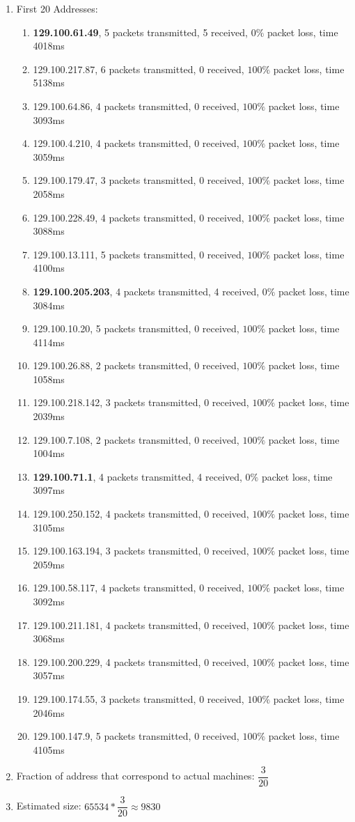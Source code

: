 \documentclass[12pt,letterpaper]{article}
\begin{document}
\begin{enumerate}
	\item First 20 Addresses:
	\begin{enumerate}
		\item \textbf{129.100.61.49}, 5 packets transmitted, 5 received, $0\%$ packet loss, time 4018ms
		\item 129.100.217.87, 6 packets transmitted, 0 received, $100\%$ packet loss, time 5138ms
		\item 129.100.64.86, 4 packets transmitted, 0 received, $100\%$ packet loss, time 3093ms
		\item 129.100.4.210, 4 packets transmitted, 0 received, $100\%$ packet loss, time 3059ms
		\item 129.100.179.47, 3 packets transmitted, 0 received, $100\%$ packet loss, time 2058ms
		\item 129.100.228.49, 4 packets transmitted, 0 received, $100\%$ packet loss, time 3088ms
		\item 129.100.13.111, 5 packets transmitted, 0 received, $100\%$ packet loss, time 4100ms
		\item \textbf{129.100.205.203}, 4 packets transmitted, 4 received, $0\%$ packet loss, time 3084ms
		\item 129.100.10.20, 5 packets transmitted, 0 received, $100\%$ packet loss, time 4114ms
		\item 129.100.26.88, 2 packets transmitted, 0 received, $100\%$ packet loss, time 1058ms
		\item 129.100.218.142, 3 packets transmitted, 0 received, $100\%$ packet loss, time 2039ms
		\item 129.100.7.108, 2 packets transmitted, 0 received, $100\%$ packet loss, time 1004ms
		\item \textbf{129.100.71.1}, 4 packets transmitted, 4 received, $0\%$ packet loss, time 3097ms
		\item 129.100.250.152, 4 packets transmitted, 0 received, $100\%$ packet loss, time 3105ms
		\item 129.100.163.194, 3 packets transmitted, 0 received, $100\%$ packet loss, time 2059ms
		\item 129.100.58.117, 4 packets transmitted, 0 received, $100\%$ packet loss, time 3092ms
		\item 129.100.211.181, 4 packets transmitted, 0 received, $100\%$ packet loss, time 3068ms
		\item 129.100.200.229, 4 packets transmitted, 0 received, $100\%$ packet loss, time 3057ms
		\item 129.100.174.55, 3 packets transmitted, 0 received, $100\%$ packet loss, time 2046ms
		\item 129.100.147.9, 5 packets transmitted, 0 received, $100\%$ packet loss, time 4105ms
	\end{enumerate}
	\item Fraction of address that correspond to actual machines: $\dfrac{3}{20}$
	\item Estimated size: $65534*\dfrac{3}{20}\approx9830$
\end{enumerate}
\end{document}
